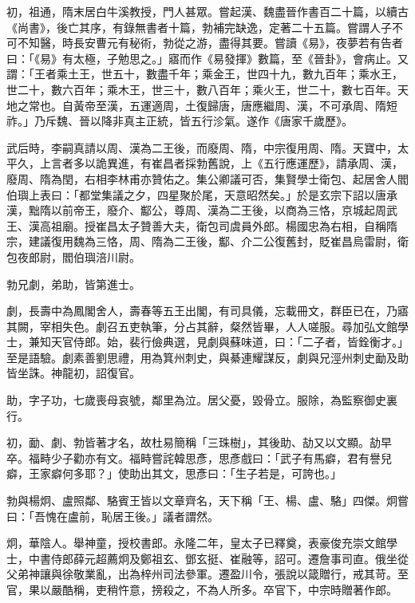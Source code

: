 \begin{pinyinscope}
 初，祖通，隋末居白牛溪教授，門人甚眾。嘗起漢、魏盡晉作書百二十篇，以續古《尚書》，後亡其序，有錄無書者十篇，勃補完缺逸，定著二十五篇。嘗謂人子不可不知醫，時長安曹元有秘術，勃從之游，盡得其要。嘗讀《易》，夜夢若有告者曰：「《易》有太極，子勉思之。」寤而作《易發揮》數篇，至《晉卦》，會病止。又謂：「王者乘土王，世五十，數盡千年；乘金王，世四十九，數九百年；乘水王，世二十，數六百年；乘木王，世三十，數八百年；乘火王，世二十，數七百年。天地之常也。自黃帝至漢，五運適周，土復歸唐，唐應繼周、漢，不可承周、隋短祚。」乃斥魏、晉以降非真主正統，皆五行沴氣。遂作《唐家千歲歷》。



 武后時，李嗣真請以周、漢為二王後，而廢周、隋，中宗復用周、隋。天寶中，太平久，上言者多以詭異進，有崔昌者採勃舊說，上《五行應運歷》，請承周、漢，廢周、隋為閏，右相李林甫亦贊佑之。集公卿議可否，集賢學士衛包、起居舍人閻伯璵上表曰：「都堂集議之夕，四星聚於尾，天意昭然矣。」於是玄宗下詔以唐承漢，黜隋以前帝王，廢介、酅公，尊周、漢為二王後，以商為三恪，京城起周武王、漢高祖廟。授崔昌太子贊善大夫，衛包司虞員外郎。楊國忠為右相，自稱隋宗，建議復用魏為三恪，周、隋為二王後，酅、介二公復舊封，貶崔昌烏雷尉，衛包夜郎尉，閻伯璵涪川尉。



 勃兄劇，弟助，皆第進士。



 劇，長壽中為鳳閣舍人，壽春等五王出閣，有司具儀，忘載冊文，群臣已在，乃寤其闕，宰相失色。劇召五吏執筆，分占其辭，粲然皆畢，人人嗟服。尋加弘文館學士，兼知天官侍郎。始，裴行儉典選，見劇與蘇味道，曰：「二子者，皆銓衡才。」至是語驗。劇素善劉思禮，用為箕州刺史，與綦連耀謀反，劇與兄涇州刺史勔及助皆坐誅。神龍初，詔復官。



 助，字子功，七歲喪母哀號，鄰里為泣。居父憂，毀骨立。服除，為監察御史裏行。



 初，勔、劇、勃皆著才名，故杜易簡稱「三珠樹」，其後助、劼又以文顯。劼早卒。福畤少子勸亦有文。福畤嘗詫韓思彥，思彥戲曰：「武子有馬癖，君有譽兒癖，王家癖何多耶？」使助出其文，思彥曰：「生子若是，可誇也。」



 勃與楊炯、盧照鄰、駱賓王皆以文章齊名，天下稱「王、楊、盧、駱」四傑。炯嘗曰：「吾愧在盧前，恥居王後。」議者謂然。



 炯，華陰人。舉神童，授校書郎。永隆二年，皇太子已釋奠，表豪俊充崇文館學士，中書侍郎薛元超薦炯及鄭祖玄、鄧玄挺、崔融等，詔可。遷詹事司直。俄坐從父弟神讓與徐敬業亂，出為梓州司法參軍。遷盈川令，張說以箴贈行，戒其苛。至官，果以嚴酷稱，吏稍忤意，搒殺之，不為人所多。卒官下，中宗時贈著作郎。




\end{pinyinscope}
